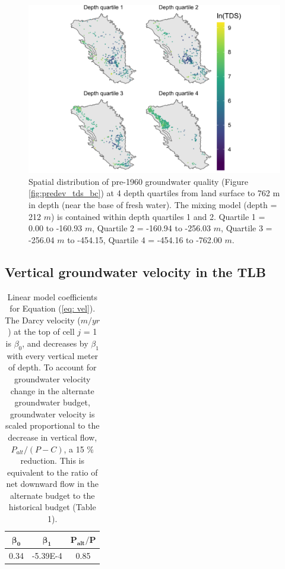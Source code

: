 \begin{figure}[H]
	\includegraphics[width=\textwidth]{ch3_appendix_figs/predev_tds_map.pdf}
	\caption{Spatial distribution of pre-1960 groundwater quality (Figure \ref{fig:predev_tds_bc}) at 4 depth quartiles from land surface to 762 m in depth (near the base of fresh water). The mixing model (depth = 212 $m$) is contained within depth quartiles 1 and 2. Quartile 1 = 0.00 to -160.93 $m$, Quartile 2 = -160.94 to -256.03  $m$, Quartile 3 = -256.04 $m$ to -454.15, Quartile 4 = -454.16 to -762.00 $m$.}
	\label{ap_b_predev_tds_map}
\end{figure}


\subsection{Vertical groundwater velocity in the TLB}




\bgroup

\renewcommand{\arraystretch}{1.5}

\setlength{\tabcolsep}{20pt}

\begin{table}[H]
	
	\caption{Linear model coefficients for Equation (\ref{eq: vel}). The Darcy velocity ($m/yr$) at the top of cell $j$ = 1 is $\beta_0$, and decreases by $\beta_1$ with every vertical meter of depth. To account for groundwater velocity change in the alternate groundwater budget, groundwater velocity is scaled proportional to the decrease in vertical flow, $P_{alt}/(P - C)$, a 15 \% reduction. This is equivalent to the ratio of net downward flow in the alternate budget to the historical budget (Table 1).}
	
	\centering
	
	\begin{tabular}{ccc}
		
		$\bm{\beta_0}$ & $\bm{\beta_1}$ & $\bm{P_{alt}/P}$ \\ 
		\hline
		0.34 & -5.39E-4 & 0.85 \\ 
		\hline
	\end{tabular}
	
	\label{ap_b_velocity_coefficients}
\end{table}
\egroup


